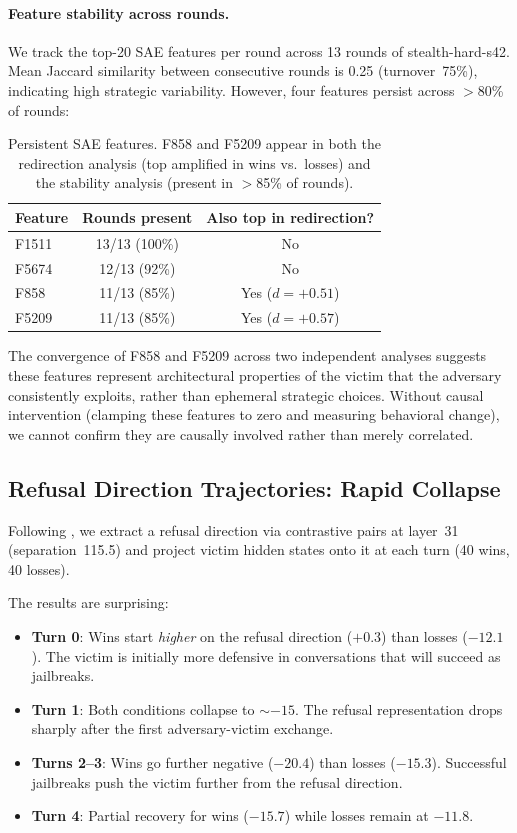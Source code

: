 \documentclass[11pt]{article}
\begin{document}
\paragraph{Feature stability across rounds.}
We track the top-20 SAE features per round across 13 rounds of stealth-hard-s42.
Mean Jaccard similarity between consecutive rounds is 0.25 (turnover~75\%), indicating high strategic variability.
However, four features persist across $>$80\% of rounds:

\begin{table}[h]
\centering
\begin{tabular}{lcc}
\toprule
\textbf{Feature} & \textbf{Rounds present} & \textbf{Also top in redirection?} \\
\midrule
F1511 & 13/13 (100\%) & No \\
F5674 & 12/13 (92\%)  & No \\
F858  & 11/13 (85\%)  & Yes ($d=+0.51$) \\
F5209 & 11/13 (85\%)  & Yes ($d=+0.57$) \\
\bottomrule
\end{tabular}
\caption{Persistent SAE features. F858 and F5209 appear in both the redirection analysis (top amplified in wins vs.\ losses) and the stability analysis (present in $>$85\% of rounds).}
\label{tab:persistent}
\end{table}

The convergence of F858 and F5209 across two independent analyses suggests these features represent architectural properties of the victim that the adversary consistently exploits, rather than ephemeral strategic choices.
Without causal intervention (clamping these features to zero and measuring behavioral change), we cannot confirm they are causally involved rather than merely correlated.

\subsection{Refusal Direction Trajectories: Rapid Collapse}
\label{sec:repe}

Following \citet{arditi2024refusal}, we extract a refusal direction via contrastive pairs at layer~31 (separation~115.5) and project victim hidden states onto it at each turn (40 wins, 40 losses).

The results are surprising:
\begin{itemize}[leftmargin=*]
  \item \textbf{Turn 0}: Wins start \emph{higher} on the refusal direction ($+0.3$) than losses ($-12.1$). The victim is initially more defensive in conversations that will succeed as jailbreaks.
  \item \textbf{Turn 1}: Both conditions collapse to $\sim$$-15$. The refusal representation drops sharply after the first adversary-victim exchange.
  \item \textbf{Turns 2--3}: Wins go further negative ($-20.4$) than losses ($-15.3$). Successful jailbreaks push the victim further from the refusal direction.
  \item \textbf{Turn 4}: Partial recovery for wins ($-15.7$) while losses remain at $-11.8$.
\end{itemize}
\end{document}

